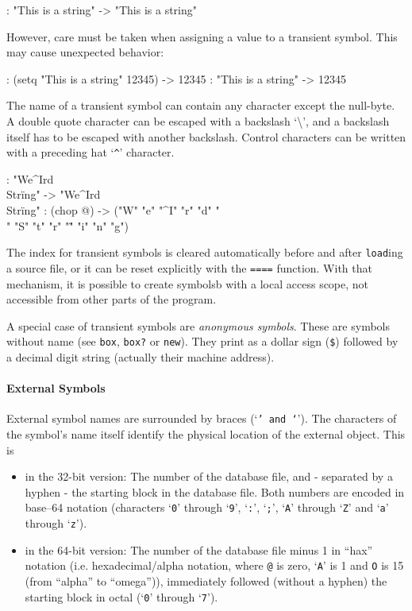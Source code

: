 \begin{wideverbatim}
: "This is a string"
-> "This is a string"
\end{wideverbatim}

However, care must be taken when assigning a value to a transient
symbol. This may cause unexpected behavior:


\begin{wideverbatim}
: (setq "This is a string" 12345)
-> 12345
: "This is a string"
-> 12345
\end{wideverbatim}

The name of a transient symbol can contain any character except the
null-byte. A double quote character can be escaped with a backslash
`\textbackslash', and a backslash itself has to be escaped with another backslash.
Control characters can be written with a preceding hat `\texttt{\^}' character.

\begin{wideverbatim}
: "We^Ird\\Str\"ing"
-> "We^Ird\\Str\"ing"
: (chop @)
-> ("W" "e" "^I" "r" "d" "\\" "S" "t" "r" "\"" "i" "n" "g")
\end{wideverbatim}

The index for transient symbols is cleared automatically before and
after  \texttt{load}ing a source file, or it can be reset explicitly with the \texttt{====} function. With that mechanism, it is possible to create symbolsb
with a local access scope, not accessible from other parts of the
program.

A special case of transient symbols are \emph{anonymous symbols}. These are
symbols without name (see \texttt{box}, \texttt{box?} or \texttt{new}). They print as a
dollar sign (\texttt{\$}) followed by a decimal digit string (actually their
machine address).


\paragraph{External Symbols}
\label{sec:refm-external-symbols}%
External symbol names are surrounded by braces (`\texttt{{}' and `\texttt{}}'). The
characters of the symbol's name itself identify the physical location of
the external object. This is

\begin{itemize}
\item in the 32-bit version: The number of the database file, and -
   separated by a hyphen - the starting block in the database file. Both
   numbers are encoded in base--64 notation (characters `\texttt{0}' through
   `\texttt{9}', `\texttt{:}', `\texttt{;}', `\texttt{A}' through `\texttt{Z}' and `\texttt{a}' through `\texttt{z}').
\item in the 64-bit version: The number of the database file minus 1 in
   ``hax'' notation (i.e. hexadecimal/alpha notation, where  \texttt{@}  is zero,
   `\texttt{A}' is 1 and  \texttt{O}  is 15 (from ``alpha'' to ``omega'')), immediately
   followed (without a hyphen) the starting block in octal (`\texttt{0}'
   through `\texttt{7}').
\end{itemize}


